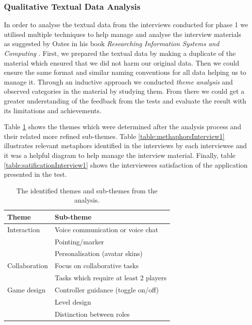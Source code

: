 \subsubsection{Qualitative Textual Data Analysis}
In order to analyse the textual data from the interviews conducted for phase 1 we utilised multiple techniques to help manage and analyse the interview materials as suggested by Oates in his book \textit{Researching Information Systems and Computing } \cite{oates2005researching}. First, we prepared the textual data by making a duplicate of the material which ensured that we did not harm our original data. Then we could ensure the same format and similar naming conventions for all data helping us to manage it. Through an inductive approach \cite{oates2005researching} we conducted \textit{theme analysis} and observed categories in the material by studying them. From there we could get a greater understanding of the feedback from the tests and evaluate the result with its limitations and achievements.

Table \ref{table:themesInterview1} shows the themes which were determined after the analysis process and their related more refined sub-themes.  Table \ref{table:methaphorsInterview1} illustrates relevant metaphors identified in the interviews by each interviewee and it was a helpful diagram to help manage the interview material. Finally, table \ref{table:satificationInterview1} shows the interviewees satisfaction of the application presented in the test.     

\begin{table}[!ht]
      \centering
        \begin{tabular}{ll}
        \toprule
        Theme & Sub-theme \\
        \midrule
        Interaction & Voice communication or voice chat\\
        & Pointing/marker \\\vspace{0.2cm}
        & Personalisation (avatar skins) \\
        Collaboration & Focus on collaborative tasks \\\vspace{0.2cm}
        & Tasks which require at least 2 players \\
        Game design & Controller guidance (toggle on/off)\\
        & Level design\\
        & Distinction between roles\\
        \bottomrule
        \end{tabular}
        \caption{The identified themes and sub-themes from the analysis.}
        \label{table:themesInterview1}
\end{table}



